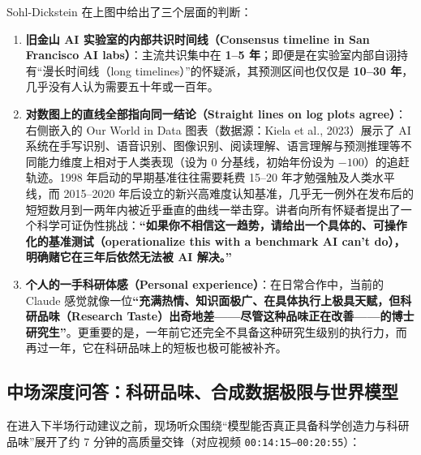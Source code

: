 \documentclass[a4paper]{article}
\begin{document}
Sohl-Dickstein 在上图中给出了三个层面的判断：
\begin{enumerate}
    \item \textbf{旧金山 AI 实验室的内部共识时间线（Consensus timeline in San Francisco AI labs）}：主流共识集中在 \textbf{1--5 年}；即便是在实验室内部自诩持有“漫长时间线（long timelines）”的怀疑派，其预测区间也仅仅是 \textbf{10--30 年}，几乎没有人认为需要五十年或一百年。
    \item \textbf{对数图上的直线全部指向同一结论（Straight lines on log plots agree）}：右侧嵌入的 Our World in Data 图表（数据源：Kiela et al., 2023）展示了 AI 系统在手写识别、语音识别、图像识别、阅读理解、语言理解与预测推理等不同能力维度上相对于人类表现（设为 $0$ 分基线，初始年份设为 $-100$）的追赶轨迹。1998 年启动的早期基准往往需要耗费 15--20 年才勉强触及人类水平线，而 2015--2020 年后设立的新兴高难度认知基准，几乎无一例外在发布后的短短数月到一两年内被近乎垂直的曲线一举击穿。讲者向所有怀疑者提出了一个科学可证伪性挑战：\textbf{“如果你不相信这一趋势，请给出一个具体的、可操作化的基准测试（operationalize this with a benchmark AI can't do），明确赌它在三年后依然无法被 AI 解决。”}
    \item \textbf{个人的一手科研体感（Personal experience）}：在日常合作中，当前的 Claude 感觉就像一位\textbf{“充满热情、知识面极广、在具体执行上极具天赋，但科研品味（Research Taste）出奇地差——尽管这种品味正在改善——的博士研究生”}。更重要的是，一年前它还完全不具备这种研究生级别的执行力，而再过一年，它在科研品味上的短板也极可能被补齐。
\end{enumerate}

\subsection{中场深度问答：科研品味、合成数据极限与世界模型}

在进入下半场行动建议之前，现场听众围绕“模型能否真正具备科学创造力与科研品味”展开了约 7 分钟的高质量交锋（对应视频 \texttt{00:14:15--00:20:55}）：
\end{document}
